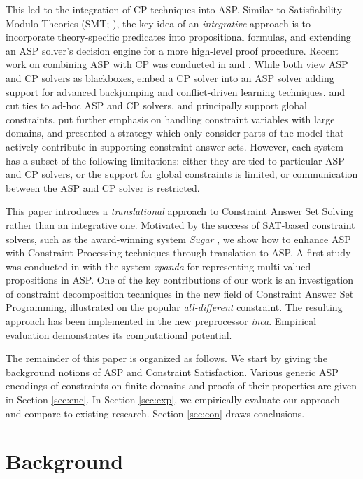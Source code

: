 \documentclass{tlp}
\newcommand{\systemname}[1]{\emph{#1}}
\begin{document}
This led to the integration of CP techniques into ASP.
Similar to Satisfiability Modulo Theories (SMT; ), the key idea of an \emph{integrative} approach is to incorporate theory-specific predicates into propositional formulas, and extending an ASP solver's decision engine for a more high-level proof procedure.
Recent work on combining ASP with CP was conducted in \cite{baboge05a,megezh08a,melgel08a} and \cite{geossc09a}. While  both view ASP and CP solvers as blackboxes,  embed a CP solver into an ASP solver adding support for advanced backjumping and conflict-driven learning techniques.
 and  cut ties to ad-hoc ASP and CP solvers, and principally support global constraints.
 put further emphasis on handling constraint variables with large domains, and presented a strategy which only consider parts of the model that actively contribute in supporting constraint answer sets.
However, each system has a subset of the following limitations: either they are tied to particular ASP and CP solvers, or the support for global constraints is limited, or communication between the ASP and CP solver is restricted.

This paper introduces a \emph{translational} approach to Constraint Answer Set Solving rather than an integrative one. Motivated by the success of SAT-based constraint solvers, such as the award-winning system \systemname{Sugar} \cite{tatakiba06a}, we show how to enhance ASP with Constraint Processing techniques through translation to ASP.
A first study was conducted in  with the system \systemname{xpanda} for representing multi-valued propositions in ASP.
One of the key contributions of our work is an investigation of constraint decomposition techniques in the new field of Constraint Answer Set Programming, illustrated on the popular \emph{all-different} constraint. The resulting approach has been implemented in the new preprocessor \systemname{inca}. Empirical evaluation demonstrates its computational potential.

The remainder of this paper is organized as follows. We start by giving the background notions of ASP and Constraint Satisfaction. Various generic ASP encodings of constraints on finite domains and proofs of their properties are given in Section \ref{sec:enc}. In Section \ref{sec:exp}, we empirically evaluate our approach and compare to existing research. Section \ref{sec:con} draws conclusions.

\section{Background}
\end{document}
